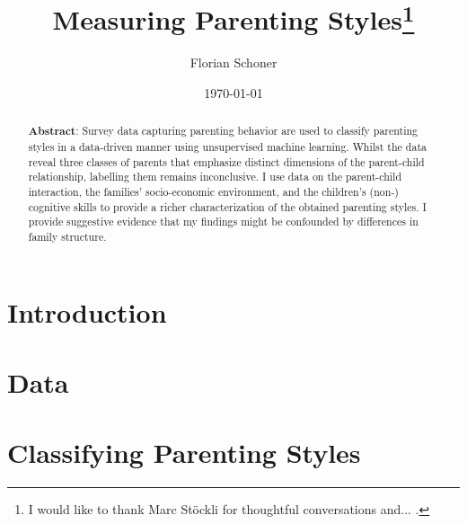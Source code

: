 \documentclass[a4paper,captions=tableheading,12pt]{scrartcl}
\title{Measuring Parenting Styles\thanks{I would like to thank Marc Stöckli for thoughtful conversations and... .}}
\author{
	\large Florian Schoner
}
\date{\large \today}
\begin{document}
	\maketitle
	\thispagestyle{empty}
	\begin{abstract}
		\noindent\textbf{Abstract}: Survey data capturing parenting behavior are used to classify parenting styles in a data-driven manner using unsupervised machine learning. Whilst the data reveal three classes of parents that emphasize distinct dimensions of the parent-child relationship, labelling them remains inconclusive. I use data on the parent-child interaction, the families' socio-economic environment, and the children's (non-) cognitive skills to provide a richer characterization of the obtained parenting styles. I provide suggestive evidence that my findings might be confounded by differences in family structure.
		\bigskip
	\end{abstract}
	\pagebreak
	
	\section{Introduction} \label{sec:intro}
	
	
	\section{Data} \label{sec:data}
	
	
	\section{Classifying Parenting Styles} \label{sec:classifying}
	
	
\end{document}
